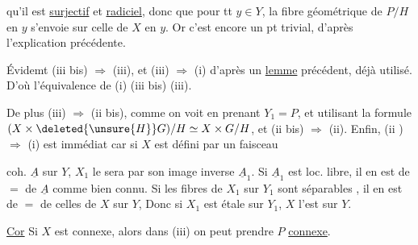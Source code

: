 qu'il est \uline{surjectif} et \uline{radiciel}, donc que pour tt $y\in Y$, la fibre géométrique de $P/H$  en $y$ s'envoie  sur celle de $X$ en $y$. Or c'est encore un pt trivial, d'après l'explication précédente.


Évidemt (iii bis) $\Rightarrow$ (iii), et (iii) $\Rightarrow$ (i) d'après un \uline{lemme} précédent, déjà utilisé. D'où l'équivalence de (i) (iii bis) (iii).

De plus (iii) $\Rightarrow$ (ii bis), comme on voit en prenant $Y_1=P$, et utilisant la formule $(X\times\deleted{\unsure{H}}G)/H\simeq X\times G/H$, et (ii bis) $\Rightarrow$ (ii). Enfin, (ii ) $\Rightarrow$ (i) est immédiat \deleted{[car la condition \unsure{sur les}} car si $X$ est défini par un faisceau


coh. $\underline A$ sur $Y$, $X_1$ le sera par son image inverse $\underline A_1$. Si $\underline A_1$ est loc. libre, il en est de $=$ de $\underline A$ comme bien connu. Si les fibres de $X_1$ sur $Y_1$ sont séparables , il en est de $=$ de celles de $X$ sur $Y$,  Donc si $X_1$ est étale sur $Y_1$, $X$ l'est sur $Y$.

\uline{Cor} Si $X$ est connexe, alors dans (iii) on peut prendre $P$ \uline{connexe}.


